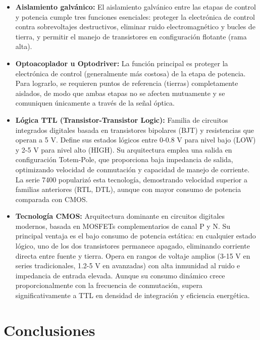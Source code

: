 \documentclass[12pt]{article}
\begin{document}
\begin{itemize}
    \item \textbf{Aislamiento galvánico:} El aislamiento galvánico entre las etapas de control y potencia cumple tres funciones esenciales: proteger la electrónica de control contra sobrevoltajes destructivos, eliminar ruido electromagnético y bucles de tierra, y permitir el manejo de transistores en configuración flotante (rama alta).
    
    \item \textbf{Optoacoplador u Optodriver:} La función principal es proteger la electrónica de control (generalmente más costosa) de la etapa de potencia. Para lograrlo, se requieren puntos de referencia (tierras) completamente aislados, de modo que ambas etapas no se afecten mutuamente y se comuniquen únicamente a través de la señal óptica.
    
    \item \textbf{Lógica TTL (Transistor-Transistor Logic):} Familia de circuitos integrados digitales basada en transistores bipolares (BJT) y resistencias que operan a 5 V. Define sus estados lógicos entre 0-0.8 V para nivel bajo (LOW) y 2-5 V para nivel alto (HIGH). Su arquitectura emplea una salida en configuración Totem-Pole, que proporciona baja impedancia de salida, optimizando velocidad de conmutación y capacidad de manejo de corriente. La serie 7400 popularizó esta tecnología, demostrando velocidad superior a familias anteriores (RTL, DTL), aunque con mayor consumo de potencia comparada con CMOS.
    
    \item \textbf{Tecnología CMOS:} Arquitectura dominante en circuitos digitales modernos, basada en MOSFETs complementarios de canal P y N. Su principal ventaja es el bajo consumo de potencia estática: en cualquier estado lógico, uno de los dos transistores permanece apagado, eliminando corriente directa entre fuente y tierra. Opera en rangos de voltaje amplios (3-15 V en series tradicionales, 1.2-5 V en avanzadas) con alta inmunidad al ruido e impedancia de entrada elevada. Aunque su consumo dinámico crece proporcionalmente con la frecuencia de conmutación, supera significativamente a TTL en densidad de integración y eficiencia energética.
\end{itemize}

\section{Conclusiones}
\end{document}
